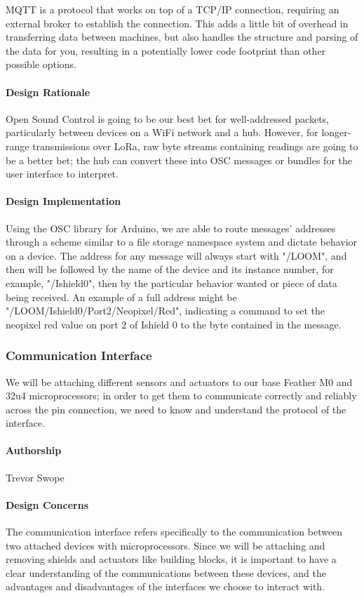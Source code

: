 \documentclass[onecolumn, draftclsnofoot,10pt, compsoc]{IEEEtran}
\begin{document}
MQTT \cite{MQTT} is a protocol that works on top of a TCP/IP connection, requiring an external broker to establish the connection. This adds a little bit of overhead in transferring data between machines, but also handles the structure and parsing of the data for you, resulting in a potentially lower code footprint than other possible options. 

\paragraph{Design Rationale}
Open Sound Control is going to be our best bet for well-addressed packets, particularly between devices on a WiFi network and a hub. However, for longer-range transmissions over LoRa, raw byte streams containing readings are going to be a better bet; the hub can convert these into OSC messages or bundles for the user interface to interpret. 

\paragraph{Design Implementation}
Using the OSC library for Arduino, we are able to route messages' addresses through a scheme similar to a file storage namespace system and dictate behavior on a device. The address for any message will always start with "/LOOM", and then will be followed by the name of the device and its instance number, for example, "/Ishield0", then by the particular behavior wanted or piece of data being received. An example of a full address might be "/LOOM/Ishield0/Port2/Neopixel/Red", indicating a command to set the neopixel red value on port 2 of Ishield 0 to the byte contained in the message. 


\subsubsection{Communication Interface}
We will be attaching different sensors and actuators to our base Feather M0 and 32u4 microprocessors; in order to get them to communicate correctly and reliably across the pin connection, we need to know and understand the protocol of the interface. 

\paragraph{Authorship}
Trevor Swope

\paragraph{Design Concerns}
The communication interface refers specifically to the communication between two attached devices with microprocessors. Since we will be attaching and removing shields and actuators like building blocks, it is important to have a clear understanding of the communications between these devices, and the advantages and disadvantages of the interfaces we choose to interact with.
\end{document}
